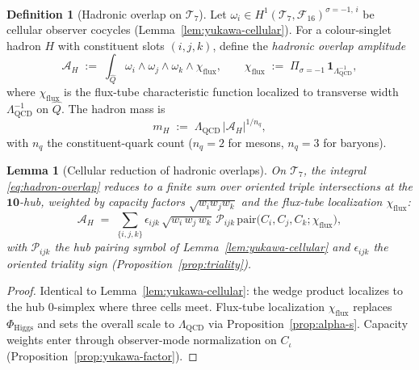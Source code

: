\documentclass[11pt]{article}
\theoremstyle{plain}
\newtheorem{lemma}[theorem]{Lemma}
\theoremstyle{definition}
\newtheorem{definition}[theorem]{Definition}
\theoremstyle{remark}
\numberwithin{equation}{section}
\begin{document}
\begin{definition}[Hadronic overlap on $\mathcal{T}_7$]
\label{def:hadron-overlap}
Let $\omega_i\in H^1(\mathcal{T}_7,\mathcal{F}_{16})^{\sigma=-1,\,i}$ be
cellular observer cocycles (Lemma~\ref{lem:yukawa-cellular}). For a colour-singlet
hadron $H$ with constituent slots $(i,j,k)$, define the \emph{hadronic
overlap amplitude}
\begin{equation}\label{eq:hadron-overlap}
  \mathcal{A}_H
  \;:=\;
  \int_{\hat Q}
  \omega_i \wedge \omega_j \wedge \omega_k \wedge \chi_{\mathrm{flux}},
  \qquad
  \chi_{\mathrm{flux}}
  \;:=\;
  \Pi_{\sigma=-1}\,\mathbf{1}_{\Lambda_{\mathrm{QCD}}^{-1}},
\end{equation}
where $\chi_{\mathrm{flux}}$ is the flux-tube characteristic function
localized to transverse width $\Lambda_{\mathrm{QCD}}^{-1}$ on $\hat Q$.
The hadron mass is
\begin{equation}\label{eq:hadron-mass-def}
  m_H
  \;:=\;
  \Lambda_{\mathrm{QCD}}\,
  |\mathcal{A}_H|^{\!1/n_q},
\end{equation}
with $n_q$ the constituent-quark count ($n_q=2$ for mesons, $n_q=3$ for
baryons).
\end{definition}

\begin{lemma}[Cellular reduction of hadronic overlaps]
\label{lem:hadron-cellular}
On $\mathcal{T}_7$, the integral \eqref{eq:hadron-overlap} reduces to a
finite sum over oriented triple intersections at the $\mathbf{10}$-hub,
weighted by capacity factors $\sqrt{w_i w_j w_k}$ and the flux-tube
localization $\chi_{\mathrm{flux}}$:
\begin{equation}\label{eq:hadron-cellular}
  \mathcal{A}_H
  \;=\;
  \sum_{\{i,j,k\}}
  \epsilon_{ijk}\,
  \sqrt{w_i\,w_j\,w_k}\,
  \mathcal{P}_{ijk}\,
  \mathrm{pair}\!\bigl(C_i,C_j,C_k;\chi_{\mathrm{flux}}\bigr),
\end{equation}
with $\mathcal{P}_{ijk}$ the hub pairing symbol of
Lemma~\ref{lem:yukawa-cellular} and $\epsilon_{ijk}$ the oriented
triality sign (Proposition~\ref{prop:triality}).
\end{lemma}

\begin{proof}
Identical to Lemma~\ref{lem:yukawa-cellular}: the wedge product localizes to
the hub $0$-simplex where three cells meet. Flux-tube localization
$\chi_{\mathrm{flux}}$ replaces $\Phi_{\mathrm{Higgs}}$ and sets the
overall scale to $\Lambda_{\mathrm{QCD}}$ via Proposition~\ref{prop:alpha-s}.
Capacity weights enter through observer-mode normalization on $C_\iota$
(Proposition~\ref{prop:yukawa-factor}).
\end{proof}
\end{document}
